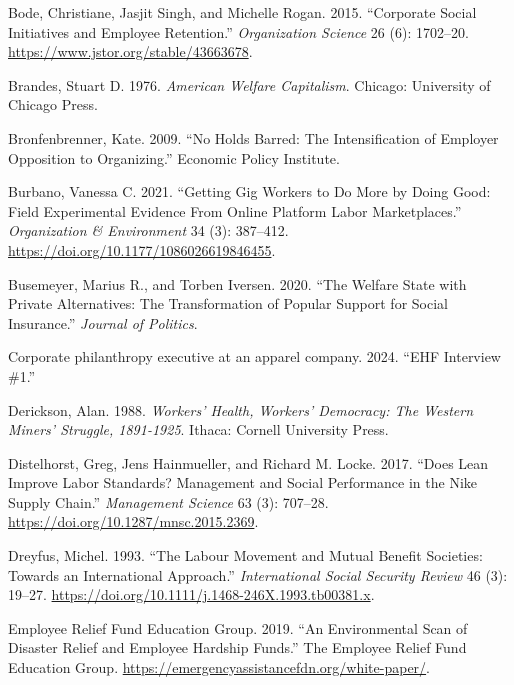 \documentclass[
  11pt,
  oneside]{article}
\newlength{\cslhangindent}
\newenvironment{CSLReferences}[2] %
 {\begin{list}{}{%
  \setlength{\itemindent}{0pt}
  \setlength{\leftmargin}{0pt}
  \setlength{\parsep}{0pt}
  \ifodd #1
   \setlength{\leftmargin}{\cslhangindent}
   \setlength{\itemindent}{-1\cslhangindent}
  \fi
  \setlength{\itemsep}{#2\baselineskip}}}
 {\end{list}}
\begin{document}
\begin{CSLReferences}{1}{0}
Bode, Christiane, Jasjit Singh, and Michelle Rogan. 2015. {``Corporate {Social Initiatives} and {Employee Retention}.''} \emph{Organization Science} 26 (6): 1702--20. \url{https://www.jstor.org/stable/43663678}.

Brandes, Stuart D. 1976. \emph{American {Welfare Capitalism}}. Chicago: University of Chicago Press.

Bronfenbrenner, Kate. 2009. {``No Holds Barred: The Intensification of Employer Opposition to Organizing.''} Economic Policy Institute.

Burbano, Vanessa C. 2021. {``Getting {Gig Workers} to {Do More} by {Doing Good}: {Field Experimental Evidence From Online Platform Labor Marketplaces}.''} \emph{Organization \& Environment} 34 (3): 387--412. \url{https://doi.org/10.1177/1086026619846455}.

Busemeyer, Marius R., and Torben Iversen. 2020. {``The {Welfare} {State} with {Private} {Alternatives}: The Transformation of Popular Support for Social Insurance.''} \emph{Journal of Politics}.

Corporate philanthropy executive at an apparel company. 2024. {``{EHF} Interview \#1.''}

Derickson, Alan. 1988. \emph{Workers' {Health}, {Workers}' {Democracy}: {The} {Western} {Miners}' {Struggle}, 1891-1925}. Ithaca: Cornell University Press.

Distelhorst, Greg, Jens Hainmueller, and Richard M. Locke. 2017. {``Does {Lean} {Improve} {Labor} {Standards}? {Management} and {Social} {Performance} in the {Nike} {Supply} {Chain}.''} \emph{Management Science} 63 (3): 707--28. \url{https://doi.org/10.1287/mnsc.2015.2369}.

Dreyfus, Michel. 1993. {``The Labour Movement and Mutual Benefit Societies: {Towards} an International Approach.''} \emph{International Social Security Review} 46 (3): 19--27. \url{https://doi.org/10.1111/j.1468-246X.1993.tb00381.x}.

Employee Relief Fund Education Group. 2019. {``An {Environmental} {Scan} of {Disaster} {Relief} and {Employee} {Hardship} {Funds}.''} The Employee Relief Fund Education Group. \url{https://emergencyassistancefdn.org/white-paper/}.


\end{CSLReferences}
\end{document}
